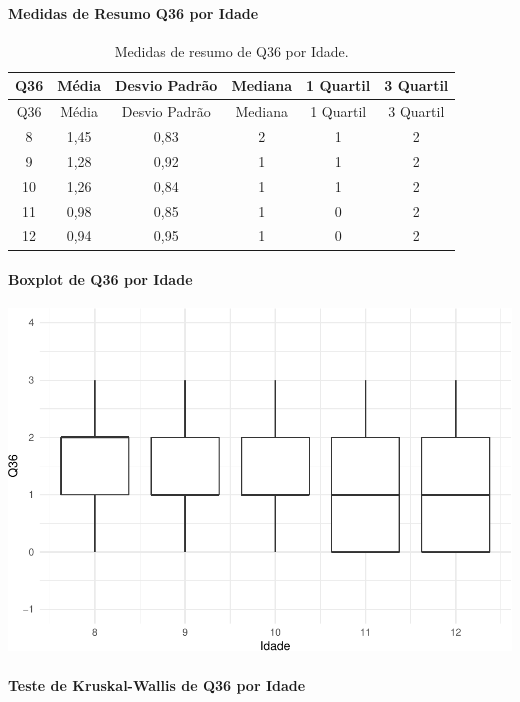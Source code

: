 \documentclass[]{article}
\let\oldparagraph\paragraph
\renewcommand{\paragraph}[1]{\oldparagraph{#1}\mbox{}}
\begin{document}
\cleardoublepage

\hypertarget{medidas-de-resumo-q36-por-idade}{%
\paragraph{Medidas de Resumo Q36 por Idade}\label{medidas-de-resumo-q36-por-idade}}

\begin{longtable}[]{@{}cccccc@{}}
\caption{\label{tab:unnamed-chunk-1334}Medidas de resumo de Q36 por Idade.}\tabularnewline
\toprule
Q36 & Média & Desvio Padrão & Mediana & 1 Quartil & 3 Quartil\tabularnewline
\midrule
\endfirsthead
\toprule
Q36 & Média & Desvio Padrão & Mediana & 1 Quartil & 3 Quartil\tabularnewline
\midrule
\endhead
8 & 1,45 & 0,83 & 2 & 1 & 2\tabularnewline
9 & 1,28 & 0,92 & 1 & 1 & 2\tabularnewline
10 & 1,26 & 0,84 & 1 & 1 & 2\tabularnewline
11 & 0,98 & 0,85 & 1 & 0 & 2\tabularnewline
12 & 0,94 & 0,95 & 1 & 0 & 2\tabularnewline
\bottomrule
\end{longtable}

\hypertarget{boxplot-de-q36-por-idade}{%
\paragraph{Boxplot de Q36 por Idade}\label{boxplot-de-q36-por-idade}}

\begin{center}\includegraphics[width=0.75\linewidth]{relatorio_covid19_files/figure-latex/unnamed-chunk-1335-1} \end{center}

\hypertarget{teste-de-kruskal-wallis-de-q36-por-idade}{%
\paragraph{Teste de Kruskal-Wallis de Q36 por Idade}\label{teste-de-kruskal-wallis-de-q36-por-idade}}
\end{document}
